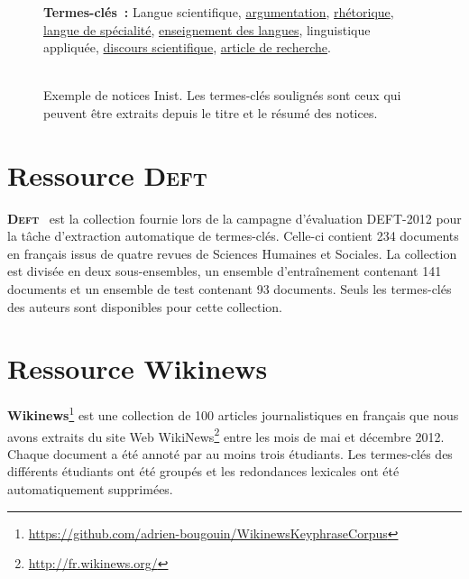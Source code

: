 \begin{figure}
{{          \textbf{Termes-clés~:} Langue scientifique,
          \underline{argumentation},  \underline{rhétorique},  \underline{langue
          de spécialité}, \underline{enseignement des langues}, linguistique
          appliquée,  \underline{discours scientifique},  \underline{article de
          recherche}. 
        }
      }
      ~\\~\\
      \caption{Exemple de notices Inist. Les termes-clés soulignés sont ceux qui
               peuvent être extraits depuis le titre et le résumé des notices.
               \label{fig:exemple_notice_inist}}
    \end{figure}


  \section{Ressource \textsc{Deft}}
  \label{sec:main-data_description-deft_data}
    \textbf{\textsc{Deft}}~\citep{paroubek2012deft} est la collection fournie lors de la
    campagne d'évaluation DEFT-2012 pour la tâche d'extraction automatique de
    termes-clés. Celle-ci contient 234 documents en français issus de quatre
    revues de Sciences Humaines et Sociales. La collection est divisée en deux
    sous-ensembles, un ensemble d'entraînement contenant 141 documents et un
    ensemble de test contenant 93 documents.  Seuls les termes-clés des auteurs
    sont disponibles pour cette collection.


  \section{Ressource Wikinews}
  \label{sec:main-data_description-wikinews_data}
    \textbf{Wikinews}\footnote{\url{https://github.com/adrien-bougouin/WikinewsKeyphraseCorpus}}
    est une collection de 100 articles journalistiques en français que nous
    avons extraits du site Web WikiNews\footnote{\url{http://fr.wikinews.org/}}
    entre les mois de mai et décembre 2012. Chaque document a été annoté par au
    moins trois étudiants. Les termes-clés des différents étudiants ont été
    groupés et les redondances lexicales ont été automatiquement supprimées.

